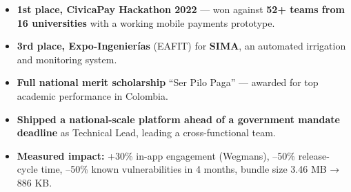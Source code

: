 \documentclass[11pt,a4paper]{awesome-cv}
\begin{document}
\begin{cvletter}
\begin{itemize}[leftmargin=3ex, nosep, noitemsep]
  \item \textbf{1st place, CivicaPay Hackathon 2022} --- won against \textbf{52+ teams from 16 universities} with a working mobile payments prototype.
  \item \textbf{3rd place, Expo-Ingenierías} (EAFIT) for \textbf{SIMA}, an automated irrigation and monitoring system.
  \item \textbf{Full national merit scholarship} ``Ser Pilo Paga'' --- awarded for top academic performance in Colombia.
  \item \textbf{Shipped a national-scale platform ahead of a government mandate deadline} as Technical Lead, leading a cross-functional team.
  \item \textbf{Measured impact:} +30\% in-app engagement (Wegmans), --50\% release-cycle time, --50\% known vulnerabilities in 4 months, bundle size 3.46 MB → 886 KB.
\end{itemize}

\end{cvletter}

\makeletterclosing
\end{document}
